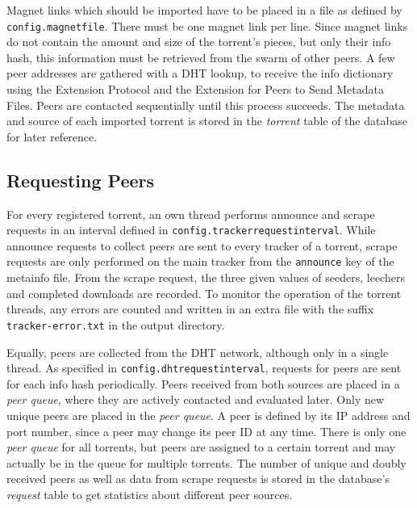 \documentclass[10pt, a4paper, twoside, headsepline]{scrbook}
\renewcommand{\_}{\origunderscore\allowbreak}
\newcommand{\config}[1]{\texttt{config.\allowbreak #1}}
\begin{document}
Magnet links which should be imported have to be placed in a file as defined by \config{magnet\_file}. There must be one magnet link per line. Since magnet links do not contain the amount and size of the torrent's pieces, but only their info hash, this information must be retrieved from the swarm of other peers. A few peer addresses are gathered with a DHT lookup, to receive the info dictionary using the Extension Protocol and the Extension for Peers to Send Metadata Files. Peers are contacted sequentially until this process succeeds. The metadata and source of each imported torrent is stored in the \emph{torrent} table of the database for later reference.

\subsection{Requesting Peers}
For every registered torrent, an own thread performs announce and scrape requests in an interval defined in \config{tracker\_request\_interval}. While announce requests to collect peers are sent to every tracker of a torrent, scrape requests are only performed on the main tracker from the \texttt{announce} key of the metainfo file. From the scrape request, the three given values of seeders, leechers and completed downloads are recorded. To monitor the operation of the torrent threads, any errors are counted and written in an extra file with the suffix \texttt{\_tracker-error.txt} in the output directory.

Equally, peers are collected from the DHT network, although only in a single thread. As specified in \config{dht\_request\_interval}, requests for peers are sent for each info hash periodically. Peers received from both sources are placed in a \emph{peer queue}, where they are actively contacted and evaluated later. Only new unique peers are placed in the \emph{peer queue}. A peer is defined by its IP address and port number, since a peer may change its peer ID at any time. There is only one \emph{peer queue} for all torrents, but peers are assigned to a certain torrent and may actually be in the queue for multiple torrents. The number of unique and doubly received peers as well as data from scrape requests is stored in the database's \emph{request} table to get statistics about different peer sources.
\end{document}
